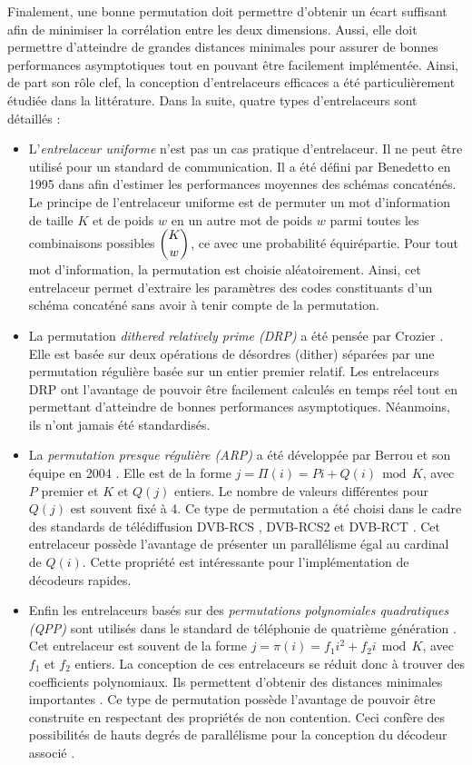 Finalement, une bonne permutation doit permettre d'obtenir un écart suffisant afin de minimiser la corrélation entre les 
deux dimensions. Aussi, elle doit permettre d'atteindre de grandes distances minimales pour assurer de bonnes performances 
asymptotiques tout en pouvant être facilement implémentée. Ainsi, de part son rôle clef, la conception  d'entrelaceurs 
efficaces a été particulièrement étudiée dans la littérature. Dans la suite, quatre types d'entrelaceurs sont détaillés :
\begin{itemize}
	\item L'\emph{entrelaceur uniforme} n'est pas un cas pratique d'entrelaceur. Il ne peut être utilisé pour un standard 
	de communication. Il a été défini par Benedetto en 1995 dans \cite{benedettoAverage} afin d'estimer les performances 
	moyennes des schémas concaténés. Le principe de l'entrelaceur uniforme est de permuter un mot d'information de taille 
	$K$ et de poids $w$ en un autre mot de poids $w$ parmi toutes les combinaisons possibles $\dbinom{K}{w}$, ce avec une 
	probabilité équirépartie. Pour tout mot d'information, la permutation est choisie aléatoirement. Ainsi, cet entrelaceur 
	permet d'extraire les paramètres des codes constituants d'un schéma concaténé sans avoir à tenir compte de la permutation.
	\item La permutation \emph{dithered relatively prime (DRP)} a été pensée par Crozier \cite{crozierDRP}. Elle est basée 
	sur deux opérations de désordres (dither) séparées par une permutation régulière basée sur un entier premier relatif. 
	Les entrelaceurs DRP ont l'avantage de pouvoir être facilement calculés en temps réel tout en permettant d'atteindre 
	de bonnes performances asymptotiques. Néanmoins, ils n'ont jamais été standardisés.
	\item La \emph{permutation presque régulière (ARP)} a été développée par Berrou et son équipe en 2004 \cite{BerrouARP}. 
	Elle est de la forme $j=\Pi(i)=Pi+Q(i)~~\text{mod}~~K$, avec $P$ premier et $K$ et $Q(j)$ entiers. Le nombre de valeurs 
	différentes pour $Q(j)$ est souvent fixé à 4. Ce type de permutation a été choisi dans le cadre des standards de 
	télédiffusion 	DVB-RCS \cite{dvbrcs},  DVB-RCS2 \cite{dvbrcs2} et  DVB-RCT \cite{dvbrct}. Cet entrelaceur possède 
	l’avantage de présenter un parallélisme égal au cardinal de $Q(i)$. Cette propriété est intéressante pour l'implémentation 
	de décodeurs rapides. 
	\item Enfin les entrelaceurs basés sur des \emph{permutations polynomiales quadratiques (QPP)} \cite{sunQPP} sont 
	utilisés dans le standard de téléphonie de quatrième génération \cite{lte}. Cet entrelaceur est souvent de la forme 
	$j=\pi(i)=f_1 i^2 + f_2 i~~\text{mod}~~K$, avec $f_1$ et $f_2$ entiers. La conception de ces entrelaceurs se réduit 
	donc à trouver des coefficients polynomiaux. Ils permettent d'obtenir des distances minimales importantes \cite{rosnesQPP}. 
	Ce type de permutation possède l'avantage de pouvoir être construite en respectant des propriétés de non contention. 
	Ceci confère des possibilités de hauts degrés de parallélisme pour la conception du décodeur associé \cite{takeshitaQPP}.  
\end{itemize}
